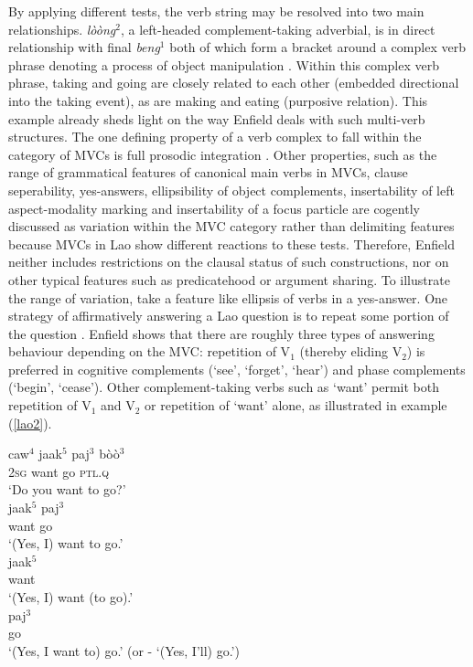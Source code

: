 By applying different tests, the verb string may be resolved into two main relationships. \textit{lòòng$^2$}, a left-headed complement-taking adverbial, is in direct relationship with final \textit{beng$^1$} both of which form a bracket around a complex verb phrase denoting a process of object manipulation \citep[83]{enfield2008verbs}. Within this complex verb phrase, taking and going are closely related to each other (embedded directional into the taking event), as are making and eating (purposive relation). This example already sheds light on the way Enfield deals with such multi-verb structures. The one defining property of a verb complex to fall within the category of MVCs is full prosodic integration \citep[104]{enfield2008verbs}. Other properties, such as the range of grammatical features of canonical main verbs in MVCs, clause seperability, yes-answers, ellipsibility of object complements, insertability of left aspect-modality marking and insertability of a focus particle are cogently discussed as variation within the MVC category rather than delimiting features because MVCs in Lao show different reactions to these tests. Therefore, Enfield neither includes restrictions on the clausal status of such constructions, nor on other typical features such as predicatehood or argument sharing. To illustrate the range of variation, take a feature like ellipsis of verbs in a yes-answer. One strategy of affirmatively answering a Lao question is to repeat some portion of the question \citep[106]{enfield2008verbs}. Enfield shows that there  are roughly three types of answering behaviour depending on the MVC: repetition of V$_1$ (thereby eliding V$_2$) is preferred in cognitive complements (`see', `forget', `hear') and phase complements (`begin', `cease'). Other complement-taking verbs such as `want' permit both repetition of  V$_1$ and V$_2$ or repetition of `want' alone, as illustrated in example (\ref{lao2}). 

\ea \label{lao2}
\ea \label{lao2a}
\gll caw$^4$ jaak$^5$ paj$^3$ bòò$^3$ \\
\textsc{2}\textsc{sg} want go \textsc{ptl}.\textsc{q} \\
\glft `Do you want to go?' \\ 
\ex \label{lao2b}
\gll jaak$^5$ paj$^3$ \\
want go \\
\glft `(Yes, I) want to go.' \\
\ex \label{lao2c}
\gll jaak$^5$ \\
want \\
\glft `(Yes, I) want (to go).' \\ 
\ex \label{lao2d}
\gll paj$^3$ \\ 
go \\
\glft `(Yes, I want to) go.' (or - `(Yes, I'll) go.')\\ 
\z
\z

